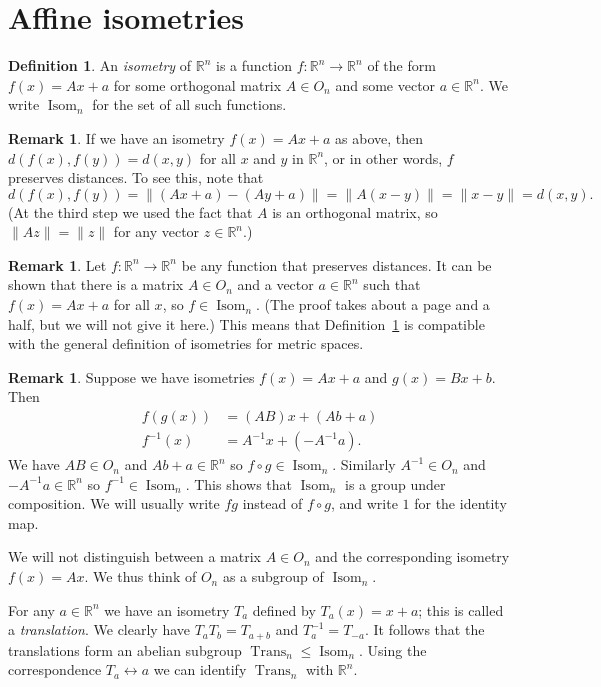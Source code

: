 \documentclass{amsart}
\DeclareMathOperator{\Trans}    {Trans}
\DeclareMathOperator{\Isom}     {Isom}
\newcommand{\R}         {{\mathbb{R}}}
\newcommand{\xra}       {\xrightarrow}
\renewcommand{\:}{\colon}
\theoremstyle{definition}
\newtheorem{remark}[theorem]{Remark}
\newtheorem{definition}[theorem]{Definition}
\begin{document}
\section{Affine isometries}

\begin{definition}\label{defn-isom}
 An \emph{isometry} of $\R^n$ is a function $f\:\R^n\xra{}\R^n$ of the
 form $f(x)=Ax+a$ for some orthogonal matrix $A\in O_n$ and some
 vector $a\in\R^n$.  We write $\Isom_n$ for the set of all such
 functions.
\end{definition}
\begin{remark}\label{rem-isom-dist}
 If we have an isometry $f(x)=Ax+a$ as above, then
 $d(f(x),f(y))=d(x,y)$ for all $x$ and $y$ in $\R^n$, or in other
 words, $f$ preserves distances.  To see this, note that
 \[ d(f(x),f(y)) = \|(Ax+a)-(Ay+a)\| = \|A(x-y)\| = 
     \|x-y\| = d(x,y).
 \]
 (At the third step we used the fact that $A$ is an orthogonal matrix,
 so $\|Az\|=\|z\|$ for any vector $z\in\R^n$.)
\end{remark}
\begin{remark}
 Let $f\:\R^n\xra{}\R^n$ be any function that preserves distances.  It
 can be shown that there is a matrix $A\in O_n$ and a vector
 $a\in\R^n$ such that $f(x)=Ax+a$ for all $x$, so $f\in\Isom_n$.  (The
 proof takes about a page and a half, but we will not give it here.)
 This means that Definition~\ref{defn-isom} is compatible with the
 general definition of isometries for metric spaces.
\end{remark}

\begin{remark}\label{rem-isom-group}
 Suppose we have isometries $f(x)=Ax+a$ and $g(x)=Bx+b$.  Then
 \begin{align*}
  f(g(x))   &= (AB)x + (Ab+a) \\
  f^{-1}(x) &= A^{-1}x + (- A^{-1}a). 
 \end{align*}
 We have $AB\in O_n$ and $Ab+a\in\R^n$ so $f\circ g\in\Isom_n$.
 Similarly $A^{-1}\in O_n$ and $-A^{-1}a\in\R^n$ so
 $f^{-1}\in\Isom_n$.  This shows that $\Isom_n$ is a group under
 composition.  We will usually write $fg$ instead of $f\circ g$, and
 write $1$ for the identity map.
\end{remark}

We will not distinguish between a matrix $A\in O_n$ and the
corresponding isometry $f(x)=Ax$.  We thus think of $O_n$ as a
subgroup of $\Isom_n$.

For any $a\in\R^n$ we have an isometry $T_a$ defined by $T_a(x)=x+a$;
this is called a \emph{translation}.  We clearly have $T_aT_b=T_{a+b}$
and $T_a^{-1}=T_{-a}$.  It follows that the translations form an
abelian subgroup $\Trans_n\leq\Isom_n$.  Using the correspondence
$T_a\leftrightarrow a$ we can identify $\Trans_n$ with $\R^n$.
\end{document}
